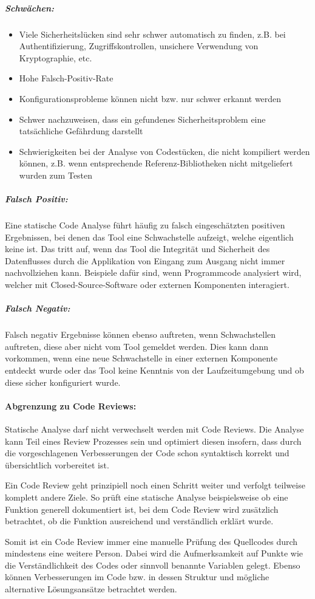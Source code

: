 \subparagraph{Schwächen:}
\begin{itemize}
\item Viele Sicherheitslücken sind sehr schwer automatisch zu finden, z.B. bei Authentifizierung, Zugriffskontrollen, unsichere Verwendung von Kryptographie, etc.
\item Hohe Falsch-Positiv-Rate
\item Konfigurationsprobleme können nicht bzw. nur schwer erkannt werden
\item Schwer nachzuweisen, dass ein gefundenes Sicherheitsproblem eine tatsächliche Gefährdung darstellt
\item Schwierigkeiten bei der Analyse von Codestücken, die nicht kompiliert werden können, z.B. wenn entsprechende Referenz-Bibliotheken nicht mitgeliefert wurden zum Testen
\end{itemize}

\subparagraph{Falsch Positiv:}
Eine statische Code Analyse führt häufig zu falsch eingeschätzten positiven Ergebnissen, bei denen das Tool eine Schwachstelle aufzeigt, welche eigentlich keine ist. Das tritt auf, wenn das Tool die Integrität und Sicherheit des Datenflusses durch die Applikation von Eingang zum Ausgang nicht immer nachvollziehen kann. Beispiele dafür sind, wenn Programmcode analysiert wird, welcher mit Closed-Source-Software oder externen Komponenten interagiert.

\subparagraph{Falsch Negativ:}
Falsch negativ Ergebnisse können ebenso auftreten, wenn Schwachstellen auftreten, diese aber nicht vom Tool gemeldet werden. Dies kann dann vorkommen, wenn eine neue Schwachstelle in einer externen Komponente entdeckt wurde oder das Tool keine Kenntnis von der Laufzeitumgebung und ob diese sicher konfiguriert wurde.

\paragraph{Abgrenzung zu Code Reviews:}
Statische Analyse darf nicht verwechselt werden mit Code Reviews. Die Analyse kann Teil eines Review Prozesses sein und optimiert diesen insofern, dass durch die vorgeschlagenen Verbesserungen der Code schon syntaktisch korrekt und übersichtlich vorbereitet ist.

Ein Code Review geht prinzipiell noch einen Schritt weiter und verfolgt teilweise komplett andere Ziele. So prüft eine statische Analyse beispielsweise ob eine Funktion generell dokumentiert ist, bei dem Code Review wird zusätzlich betrachtet, ob die Funktion ausreichend und verständlich erklärt wurde.

Somit ist ein Code Review immer eine manuelle Prüfung des Quellcodes durch mindestens eine weitere Person. Dabei wird die Aufmerksamkeit auf Punkte wie die Verständlichkeit des Codes oder sinnvoll benannte Variablen gelegt. Ebenso können Verbesserungen im Code bzw. in dessen Struktur und mögliche alternative Lösungsansätze betrachtet werden.
